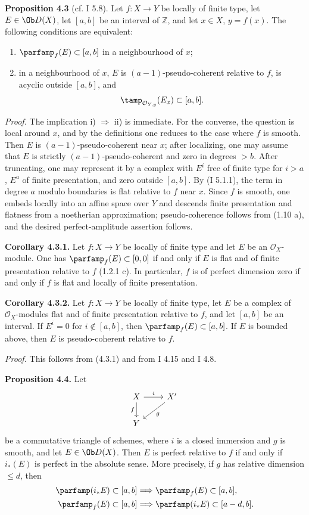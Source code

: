 \textbf{Proposition 4.3} (cf. I 5.8). Let \(f:X\to Y\) be locally of finite type, let \(E\in\Ob D(X)\), let \([a,b]\) be an interval of \(\mathbb Z\), and let \(x\in X\), \(y=f(x)\). The following conditions are equivalent:
\begin{enumerate}[label=\roman*)]
\item \(\parfamp_f(E)\subset[a,b]\) in a neighbourhood of \(x\);
\item in a neighbourhood of \(x\), \(E\) is \((a-1)\)-pseudo-coherent relative to \(f\), is acyclic outside \([a,b]\), and
\[
 \tamp_{\mathcal O_{Y,y}}(E_x)\subset[a,b].
\]
\end{enumerate}

\emph{Proof.} The implication i) \(\Rightarrow\) ii) is immediate. For the converse, the question is local around \(x\), and by the definitions one reduces to the case where \(f\) is smooth. Then \(E\) is \((a-1)\)-pseudo-coherent near \(x\); after localizing, one may assume that \(E\) is strictly \((a-1)\)-pseudo-coherent and zero in degrees \(>b\). After truncating, one may represent it by a complex with \(E^i\) free of finite type for \(i>a\), \(E^a\) of finite presentation, and zero outside \([a,b]\). By (I 5.1.1), the term in degree \(a\) modulo boundaries is flat relative to \(f\) near \(x\). Since \(f\) is smooth, one embeds locally into an affine space over \(Y\) and descends finite presentation and flatness from a noetherian approximation; pseudo-coherence follows from (1.10 a), and the desired perfect-amplitude assertion follows.

\textbf{Corollary 4.3.1.} Let \(f:X\to Y\) be locally of finite type and let \(E\) be an \(\mathcal O_X\)-module. One has \(\parfamp_f(E)\subset[0,0]\) if and only if \(E\) is flat and of finite presentation relative to \(f\) (1.2.1 c). In particular, \(f\) is of perfect dimension zero if and only if \(f\) is flat and locally of finite presentation.

\textbf{Corollary 4.3.2.} Let \(f:X\to Y\) be locally of finite type, let \(E\) be a complex of \(\mathcal O_X\)-modules flat and of finite presentation relative to \(f\), and let \([a,b]\) be an interval. If \(E^i=0\) for \(i\notin[a,b]\), then \(\parfamp_f(E)\subset[a,b]\). If \(E\) is bounded above, then \(E\) is pseudo-coherent relative to \(f\).

\emph{Proof.} This follows from (4.3.1) and from I 4.15 and I 4.8.

\textbf{Proposition 4.4.} Let
\[
\begin{tikzcd}
X \arrow[r,"i"] \arrow[d,"f"'] & X' \arrow[dl,"g"]\\
Y &
\end{tikzcd}
\]
be a commutative triangle of schemes, where \(i\) is a closed immersion and \(g\) is smooth, and let \(E\in\Ob D(X)\). Then \(E\) is perfect relative to \(f\) if and only if \(i_*(E)\) is perfect in the absolute sense. More precisely, if \(g\) has relative dimension \(\leq d\), then
\begin{align*}
\parfamp(i_*E)
  \subset[a,b]&\Longrightarrow \parfamp_f(E)
  \subset[a,b],\\
\parfamp_f(E)
  \subset[a,b]&\Longrightarrow \parfamp(i_*E)
  \subset[a-d,b].
\end{align*}

